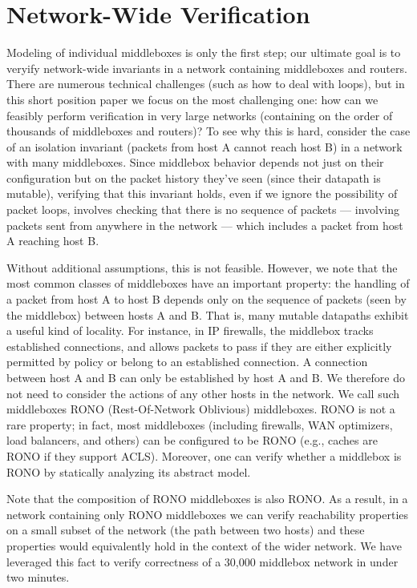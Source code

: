 \section{Network-Wide Verification}
\label{sec:modelnet}

Modeling of individual middleboxes is only the first step; our ultimate goal is to veryify network-wide invariants in a network containing middleboxes and routers.
There are numerous technical challenges (such as how to deal with loops), but in this short position paper we focus on the most challenging one: how can we feasibly perform verification in very large networks (containing on the order of thousands of middleboxes and routers)? To see why this is hard, consider the case of an isolation invariant (packets from host A cannot reach host B) in a network with many middleboxes. Since middlebox behavior depends not just on their configuration but on the packet history they've seen (since their datapath is mutable), verifying that this invariant holds, even if we ignore the possibility of packet loops,
involves checking that there is no sequence of packets --- involving packets sent from anywhere in the network --- which includes a packet from host A reaching host B.


Without additional assumptions, this is not feasible. However, we note that the most common classes of middleboxes have an important property: the handling of a packet from host A to host B depends only on the sequence of packets (seen by the middlebox) between hosts A and B. That is, many mutable datapaths exhibit a useful kind of locality.
For instance, in IP
firewalls, the middlebox tracks established connections, and allows packets to pass if they are either explicitly permitted by
policy or belong to an established connection. A connection between host A and B can only be established by host A and B. We therefore do not need to consider the
actions of any other hosts in the network. We call such middleboxes RONO (Rest-Of-Network Oblivious) middleboxes. RONO is not a rare property; in fact, most middleboxes (including firewalls, WAN optimizers, load balancers, and others) can be configured to be RONO (e.g., caches are RONO if they support ACLS).  Moreover, one can verify whether a middlebox is RONO by statically analyzing its abstract model.


Note that the composition of RONO middleboxes is also RONO.  As a result, in a network containing only RONO
middleboxes we can verify reachability properties on a small subset of the network (the path between two hosts) and these properties would equivalently hold in
the context of the wider network. We have leveraged this fact to verify correctness of a 30,000 middlebox network in under two minutes.



